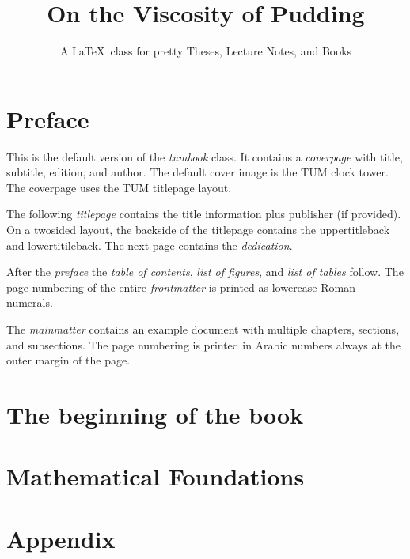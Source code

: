 \documentclass{tumbook}
\title{On the Viscosity of Pudding}
\subtitle{A \LaTeX\ class for pretty Theses, Lecture Notes, and Books}
\begin{document}
\frontmatter
\maketitle

\chapter{Preface}
 {\color{TUMOrange}This is the default version of the \emph{tumbook} class.
  It contains a \emph{coverpage} with title, subtitle, edition, and author.
  The default cover image is the TUM clock tower. The coverpage uses the TUM
  titlepage layout.\par
  The following \emph{titlepage} contains the title information plus publisher
  (if provided). On a twosided layout, the backside of the titlepage contains
  the uppertitleback and lowertitileback. The next page contains the
  \emph{dedication}.\par
  After the \emph{preface} the \emph{table of contents},
  \emph{list of figures}, and \emph{list of tables} follow.
  The page numbering of the entire \emph{frontmatter} is printed as
  lowercase Roman numerals.\par
  The \emph{mainmatter} contains an example document with multiple chapters,
  sections, and subsections. The page numbering is printed in Arabic numbers
  always at the outer margin of the page.
 }

\lipsum[1-4]
\cleardoublepage

\tableofcontents
\listoffigures
\listoftables

\mainmatter
\chapter{The beginning of the book}


\chapter{Mathematical Foundations}


\appendix
\chapter{Appendix}


\backmatter


\end{document}
